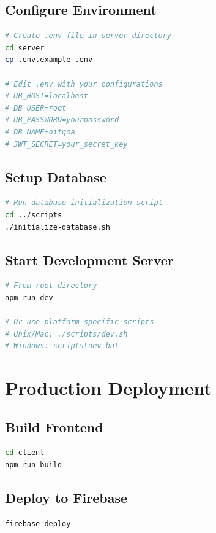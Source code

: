 \documentclass[12pt,a4paper]{report}
\begin{document}
\begin{appendices}
\subsection{Configure Environment}
\begin{lstlisting}[language=bash]
# Create .env file in server directory
cd server
cp .env.example .env

# Edit .env with your configurations
# DB_HOST=localhost
# DB_USER=root
# DB_PASSWORD=yourpassword
# DB_NAME=nitgoa
# JWT_SECRET=your_secret_key
\end{lstlisting}

\subsection{Setup Database}
\begin{lstlisting}[language=bash]
# Run database initialization script
cd ../scripts
./initialize-database.sh
\end{lstlisting}

\subsection{Start Development Server}
\begin{lstlisting}[language=bash]
# From root directory
npm run dev

# Or use platform-specific scripts
# Unix/Mac: ./scripts/dev.sh
# Windows: scripts\dev.bat
\end{lstlisting}

\section{Production Deployment}

\subsection{Build Frontend}
\begin{lstlisting}[language=bash]
cd client
npm run build
\end{lstlisting}

\subsection{Deploy to Firebase}
\begin{lstlisting}[language=bash]
firebase deploy
\end{lstlisting}

\end{appendices}
\end{document}
